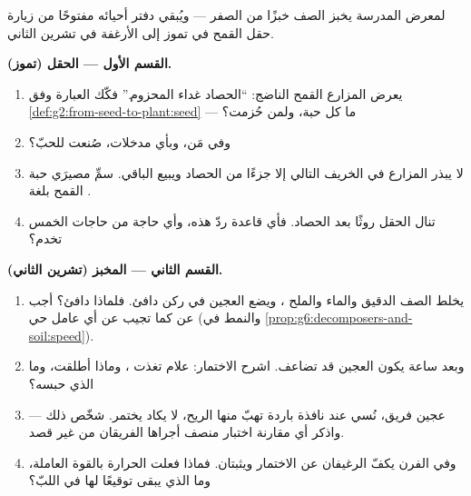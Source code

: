 \begin{problem}\label{pb:g6:producing-our-food:1}
لمعرض المدرسة يخبز الصف خبزًا من الصفر --- ويُبقي دفتر أحيائه
مفتوحًا من زيارة حقل القمح في تموز إلى الأرغفة في تشرين الثاني.

\medskip\noindent\textbf{القسم الأول --- الحقل (تموز).}
\begin{enumerate}
  \item يعرض المزارع القمح الناضج: ``الحصاد غداء 
        المحزوم.'' فكّك العبارة وفق \cref{def:g2:from-seed-to-plant:seed}
        --- ما كل حبة، ولمن حُزمت؟
  \item وفي  مَن، وبأي مدخلات، صُنعت  للحبّ؟
  \item لا يبذر المزارع في الخريف التالي إلا جزءًا من الحصاد
        ويبيع الباقي. سمِّ مصيرَي حبة القمح بلغة .
  \item تنال  الحقل روثًا بعد الحصاد. فأي قاعدة ردّ هذه، وأي
        حاجة من حاجات  الخمس تخدم؟
\end{enumerate}

\medskip\noindent\textbf{القسم الثاني --- المخبز (تشرين الثاني).}
\begin{enumerate}[resume]
  \item يخلط الصف الدقيق والماء والملح ، ويضع العجين في
        ركن دافئ. فلماذا دافئ؟ أجب عن  كما تجيب عن أي عامل
        حي (والنمط في \cref{prop:g6:decomposers-and-soil:speed}).
  \item وبعد ساعة يكون العجين قد تضاعف. اشرح الاختمار: علام تغذت
        ، وماذا أطلقت، وما الذي حبسه؟
  \item عجين فريق، نُسي عند نافذة باردة تهبّ منها الريح، لا يكاد
        يختمر. شخّص ذلك --- واذكر أي مقارنة اختبار منصف أجراها
        الفريقان من غير قصد.
  \item وفي الفرن يكفّ الرغيفان عن الاختمار ويثبتان. فماذا فعلت
        الحرارة بالقوة العاملة، وما الذي يبقى توقيعًا لها في
        اللبّ؟
\end{enumerate}


\end{problem}
